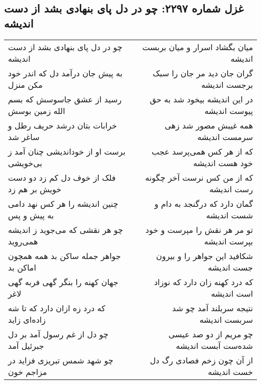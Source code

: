 \begin{center}
\section*{غزل شماره ۲۲۹۷: چو در دل پای بنهادی بشد از دست اندیشه}
\label{sec:2297}
\begin{longtable}{l p{0.5cm} r}
چو در دل پای بنهادی بشد از دست اندیشه
&&
میان بگشاد اسرار و میان بربست اندیشه
\\
به پیش جان درآمد دل که اندر خود مکن منزل
&&
گران جان دید مر جان را سبک برجست اندیشه
\\
رسید از عشق جاسوسش که بسم الله زمین بوسش
&&
در این اندیشه بیخود شد به حق پیوست اندیشه
\\
خرابات بتان درشد حریف رطل و ساغر شد
&&
همه غیبش مصور شد زهی سرمست اندیشه
\\
برست او از خوداندیشی چنان آمد ز بی‌خویشی
&&
که از هر کس همی‌پرسد عجب خود هست اندیشه
\\
فلک از خوف دل کم زد دو دست خویش بر هم زد
&&
که از من کس نرست آخر چگونه رست اندیشه
\\
چنین اندیشه را هر کس نهد دامی به پیش و پس
&&
گمان دارد که درگنجد به دام و شست اندیشه
\\
چو هر نقشی که می‌جوید ز اندیشه همی‌روید
&&
تو مر هر نقش را مپرست و خود بپرست اندیشه
\\
جواهر جمله ساکن بد همه همچون اماکن بد
&&
شکافید این جواهر را و بیرون جست اندیشه
\\
جهان کهنه را بنگر گهی فربه گهی لاغر
&&
که درد کهنه زان دارد که نوزاد است اندیشه
\\
که درد زه ازان دارد که تا شه زاده‌ای زاید
&&
نتیجه سربلند آمد چو شد سربست اندیشه
\\
چو دل از غم رسول آمد بر دل جبرئیل آمد
&&
چو مریم از دو صد عیسی شده‌ست آبست اندیشه
\\
چو شهد شمس تبریزی فزاید در مزاجم خون
&&
از آن چون زخم فصادی رگ دل خست اندیشه
\\
\end{longtable}
\end{center}
